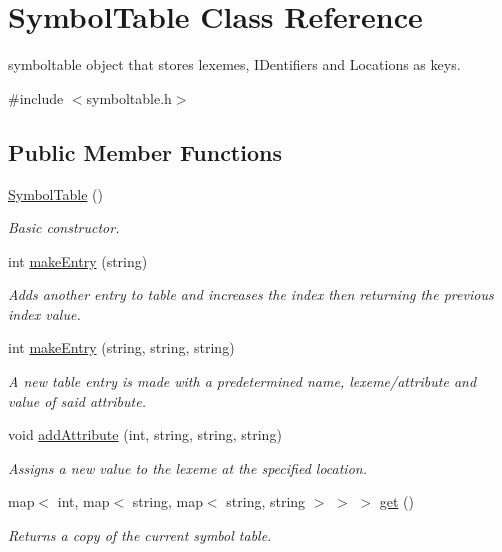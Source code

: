 \hypertarget{classSymbolTable}{
\section{SymbolTable Class Reference}
\label{classSymbolTable}
}


symboltable object that stores lexemes, IDentifiers and Locations as keys.  




{\ttfamily \#include $<$symboltable.h$>$}

\subsection*{Public Member Functions}
\begin{DoxyCompactItemize}
\item 
\hyperlink{classSymbolTable_a1fbe6cec5594463b766db0ac58c9aa1d}{SymbolTable} ()
\begin{DoxyCompactList}\small\item\em Basic constructor. \end{DoxyCompactList}\item 
int \hyperlink{classSymbolTable_a1df7dfc3592c924e8c8a9fea1e13bf89}{makeEntry} (string)
\begin{DoxyCompactList}\small\item\em Adds another entry to table and increases the index then returning the previous index value. \end{DoxyCompactList}\item 
int \hyperlink{classSymbolTable_a064e30f7ddbd4065244d1d41ea885737}{makeEntry} (string, string, string)
\begin{DoxyCompactList}\small\item\em A new table entry is made with a predetermined name, lexeme/attribute and value of said attribute. \end{DoxyCompactList}\item 
void \hyperlink{classSymbolTable_ac7a86e820025627863b4277cf84353a0}{addAttribute} (int, string, string, string)
\begin{DoxyCompactList}\small\item\em Assigns a new value to the lexeme at the specified location. \end{DoxyCompactList}\item 
map$<$ int, map$<$ string, map$<$ string, string $>$ $>$ $>$ \hyperlink{classSymbolTable_ad9429553f1aadeade3339e32e4f4c61e}{get} ()
\begin{DoxyCompactList}\small\item\em Returns a copy of the current symbol table. \end{DoxyCompactList}\item 

\end{DoxyCompactItemize}

